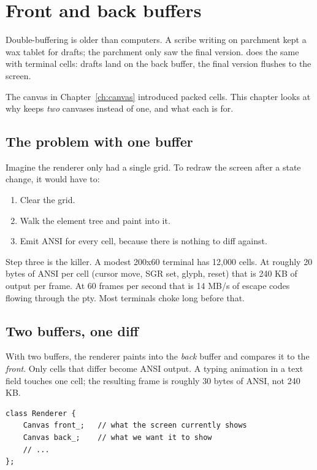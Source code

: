 \chapter{Front and back buffers}
\label{ch:buffers}

\begin{aside}
Double-buffering is older than computers. A scribe writing on
parchment kept a wax tablet for drafts; the parchment only saw the
final version. \maya{} does the same with terminal cells: drafts
land on the back buffer, the final version flushes to the screen.
\end{aside}

The canvas in Chapter~\ref{ch:canvas} introduced packed cells. This
chapter looks at why \maya{} keeps \emph{two} canvases instead of
one, and what each is for.

\section{The problem with one buffer}

Imagine the renderer only had a single grid. To redraw the screen
after a state change, it would have to:

\begin{enumerate}[leftmargin=*]
  \item Clear the grid.
  \item Walk the element tree and paint into it.
  \item Emit ANSI for every cell, because there is nothing to
    diff against.
\end{enumerate}

Step three is the killer. A modest 200x60 terminal has 12,000
cells. At roughly 20 bytes of ANSI per cell (cursor move, SGR set,
glyph, reset) that is 240 KB of output per frame. At 60 frames per
second that is 14 MB/s of escape codes flowing through the pty.
Most terminals choke long before that.

\section{Two buffers, one diff}

With two buffers, the renderer paints into the \emph{back} buffer
and compares it to the \emph{front}. Only cells that differ become
ANSI output. A typing animation in a text field touches one cell;
the resulting frame is roughly 30 bytes of ANSI, not 240 KB.

\begin{lstlisting}
class Renderer {
    Canvas front_;   // what the screen currently shows
    Canvas back_;    // what we want it to show
    // ...
};
\end{lstlisting}

